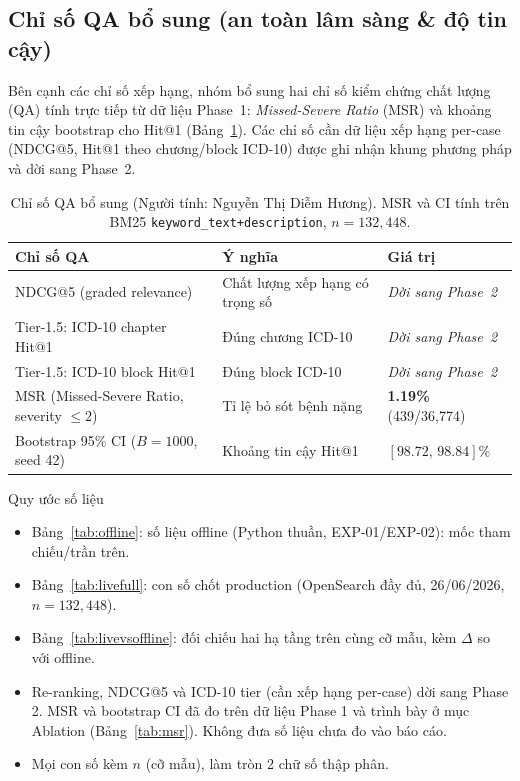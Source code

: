 \subsection{Chỉ số QA bổ sung (an toàn lâm sàng \& độ tin cậy)}
Bên cạnh các chỉ số xếp hạng, nhóm bổ sung hai chỉ số kiểm chứng chất lượng (QA) tính trực tiếp từ dữ liệu Phase~1: \emph{Missed-Severe Ratio} (MSR) và khoảng tin cậy bootstrap cho Hit@1 (Bảng~\ref{tab:qa}). Các chỉ số cần dữ liệu xếp hạng per-case (NDCG@5, Hit@1 theo chương/block ICD-10) được ghi nhận khung phương pháp và dời sang Phase~2.

\begin{table}[H]
  \centering
  \small
  \caption{Chỉ số QA bổ sung (Người tính: Nguyễn Thị Diễm Hương). MSR và CI tính
  trên BM25 \texttt{keyword\_text+description}, $n=132{,}448$.}
  \label{tab:qa}
  \begin{tabular}{p{5.6cm}p{3.4cm}p{3.2cm}}
    \toprule
    \textbf{Chỉ số QA}                          & \textbf{Ý nghĩa}                & \textbf{Giá trị}               \\
    \midrule
    NDCG@5 (graded relevance)                   & Chất lượng xếp hạng có trọng số & \textit{Dời sang Phase~2}      \\
    Tier-1.5: ICD-10 chapter Hit@1              & Đúng chương ICD-10              & \textit{Dời sang Phase~2}      \\
    Tier-1.5: ICD-10 block Hit@1                & Đúng block ICD-10               & \textit{Dời sang Phase~2}      \\
    MSR (Missed-Severe Ratio, severity $\le 2$) & Tỉ lệ bỏ sót bệnh nặng          & \textbf{1.19\%} (439/36{,}774) \\
    Bootstrap 95\% CI ($B=1000$, seed 42)       & Khoảng tin cậy Hit@1            & $[98.72,\,98.84]\%$            \\
    \bottomrule
  \end{tabular}
\end{table}

\begin{notebox}{Quy ước số liệu}
  \begin{itemize}
    \item Bảng~\ref{tab:offline}: số liệu offline (Python thuần, EXP-01/EXP-02): mốc tham chiếu/trần trên.
    \item Bảng~\ref{tab:livefull}: con số chốt production (OpenSearch đầy đủ, 26/06/2026, $n=132{,}448$).
    \item Bảng~\ref{tab:livevsoffline}: đối chiếu hai hạ tầng trên cùng cỡ mẫu, kèm $\Delta$ so với offline.
    \item Re-ranking, NDCG@5 và ICD-10 tier (cần xếp hạng per-case) dời sang Phase 2. MSR và bootstrap CI đã đo trên dữ liệu Phase 1 và trình bày ở mục Ablation (Bảng~\ref{tab:msr}). Không đưa số liệu chưa đo vào báo cáo.
    \item Mọi con số kèm $n$ (cỡ mẫu), làm tròn 2 chữ số thập phân.
  \end{itemize}
\end{notebox}
